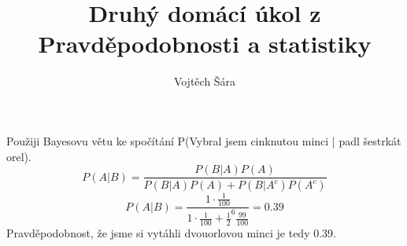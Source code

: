 \documentclass{article}
\title{Druhý domácí úkol z Pravděpodobnosti a statistiky}
\author{Vojtěch Šára}
\begin{document}
\maketitle
Použiji Bayesovu větu ke spočítání P(Vybral jsem cinknutou minci | padl šestrkát orel).
$$P(A|B) = \frac{P(B|A)P(A)}{P(B|A)P(A)+P(B|A^{c})P(A^{c})}$$
$$P(A|B) = \frac{1\cdot \frac{1}{100}}{1\cdot \frac{1}{100}+\frac{1}{2}^{6}\frac{99}{100}} = 0.39$$
Pravděpodobnost, že jsme si vytáhli dvouorlovou minci je tedy 0.39.
\end{document}
